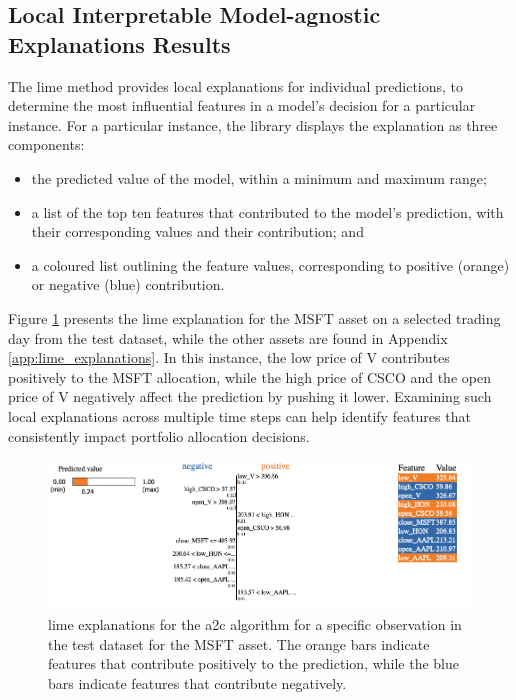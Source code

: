 \subsection{Local Interpretable Model-agnostic Explanations Results} \label{sec:lime-results}

The \acrshort{lime} method provides local explanations for individual predictions, to determine the most influential features in a model's decision for a particular instance. For a particular instance, the library displays the explanation as three components:
\begin{itemize}
    \item the predicted value of the model, within a minimum and maximum range;
    \item a list of the top ten features that contributed to the model's prediction, with their corresponding values and their contribution; and
    \item a coloured list outlining the feature values, corresponding to positive (orange) or negative (blue) contribution.
\end{itemize}

Figure \ref{fig:a2c_lime_msft} presents the \acrshort{lime} explanation for the MSFT asset on a selected trading day from the test dataset, while the other assets are found in Appendix \ref{app:lime_explanations}. In this instance, the low price of V contributes positively to the MSFT allocation, while the high price of CSCO and the open price of V negatively affect the prediction by pushing it lower. Examining such local explanations across multiple time steps can help identify features that consistently impact portfolio allocation decisions.

\begin{figure}
    \centering
    \includegraphics[width=\textwidth]{figures/a2c_lime_msft.png}
    \caption{\acrshort{lime} explanations for the \acrshort{a2c} algorithm for a specific observation in the test dataset for the MSFT asset. The orange bars indicate features that contribute positively to the prediction, while the blue bars indicate features that contribute negatively.}
    \label{fig:a2c_lime_msft}
\end{figure}

